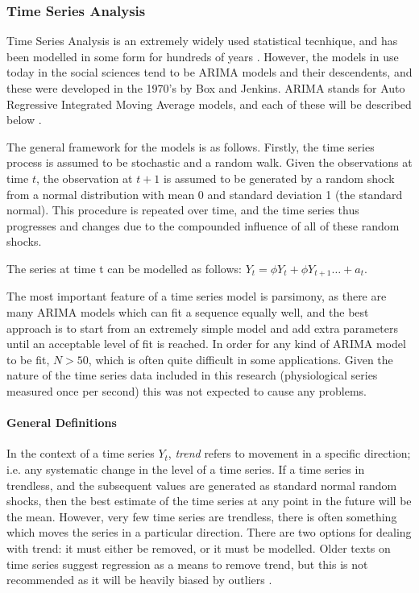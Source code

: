 \subsubsection{Time Series Analysis}

Time Series Analysis is an extremely widely used statistical tecnhique, and has been modelled in some form for hundreds of years \cite{stigler1986history}. However, the models in use today in the social sciences tend to be ARIMA models and their descendents, and these were developed in the 1970's by Box and Jenkins\cite{box1970time}. ARIMA stands for Auto Regressive Integrated Moving Average models, and each of these will be described below \cite{mccleary1980applied}. 

The general framework for the models is as follows. Firstly, the time series process is assumed to be stochastic and a random walk. Given the observations at time $t$, the observation at $t+1$ is assumed to be generated by a random shock from a normal distribution with mean 0 and standard deviation 1 (the standard normal). This procedure is repeated over time, and the time series thus progresses and changes due to the compounded influence of all of these random shocks. 

The series at time t can be modelled as follows: $Y_t=\phi Y_t+\phi Y_{t+1}\ldots+a_t$. 

The most important feature of a time series model is parsimony, as there are many ARIMA models which can fit a sequence equally well, and the best approach is to start from an extremely simple model and add extra parameters until an acceptable level of fit is reached.  In order for any kind of ARIMA model to be fit, $N>50$, which is often quite difficult in some applications. Given the nature of the time series data included in this research (physiological series measured once per second) this was not expected to cause any problems. 

\paragraph{General Definitions}

In the context of a time series $Y_t$, \textit{trend} refers to movement in a specific direction; i.e. any systematic change in the level of a time series. If a time series in trendless, and the subsequent values are generated as standard normal random shocks, then the best estimate of the time series at any point in the future will be the mean. However, very few time series are trendless, there is often something which moves the series in a particular direction. There are two options for dealing with trend: it must either be removed, or it must be modelled. Older texts on time series suggest regression as a means to remove trend, but this is not recommended as it will be heavily biased by outliers \cite{mccleary1980applied}. 

